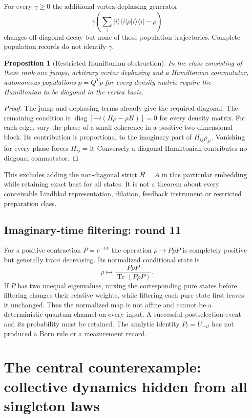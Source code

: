 \documentclass[11pt,a4paper]{article}
\newtheorem{proposition}[theorem]{Proposition}
\newcommand{\diag}{\operatorname{diag}}
\newcommand{\Tr}{\operatorname{Tr}}
\begin{document}
For every $\gamma\ge0$ the additional vertex-dephasing generator
\[
 \gamma\left(\sum_i|i\rangle\langle i|\rho|i\rangle\langle i|-\rho\right)
\]
changes off-diagonal decay but none of those population trajectories.
Complete population records do not identify $\gamma$.

\begin{proposition}[Restricted Hamiltonian obstruction]
In the class consisting of these rank-one jumps, arbitrary vertex
dephasing and a Hamiltonian commutator, autonomous populations
$\dot p=Q^Tp$ for every density matrix require the Hamiltonian to be
diagonal in the vertex basis.
\end{proposition}
\begin{proof}
The jump and dephasing terms already give the required diagonal. The
remaining condition is
$\diag[-i(H\rho-\rho H)]=0$ for every density matrix. For each edge,
vary the phase of a small coherence in a positive two-dimensional block.
Its contribution is proportional to the imaginary part of
$H_{ij}\rho_{ji}$. Vanishing for every phase forces $H_{ij}=0$.
Conversely a diagonal Hamiltonian contributes no diagonal commutator.
\end{proof}

This excludes adding the non-diagonal strict $H=A$ in this particular
embedding while retaining exact heat for all states. It is not a theorem
about every conceivable Lindblad representation, dilation, feedback
instrument or restricted preparation class.

\subsection{Imaginary-time filtering: round 11}

For a positive contraction $P=e^{-tA}$ the operation $\rho\mapsto P\rho P$
is completely positive but generally trace decreasing. Its normalized
conditional state is
\[
 \rho\longmapsto \frac{P\rho P}{\Tr(P\rho P)}.
\]
If $P$ has two unequal eigenvalues, mixing the corresponding pure states
before filtering changes their relative weights, while filtering each pure
state first leaves it unchanged. Thus the normalized map is not affine and
cannot be a deterministic quantum channel on every input. A successful
postselection event and its probability must be retained. The analytic
identity $P_t=U_{-it}$ has not produced a Born rule or a measurement record.

\section{The central counterexample: collective dynamics hidden from all singleton laws}
\label{sec:collective}
\end{document}
